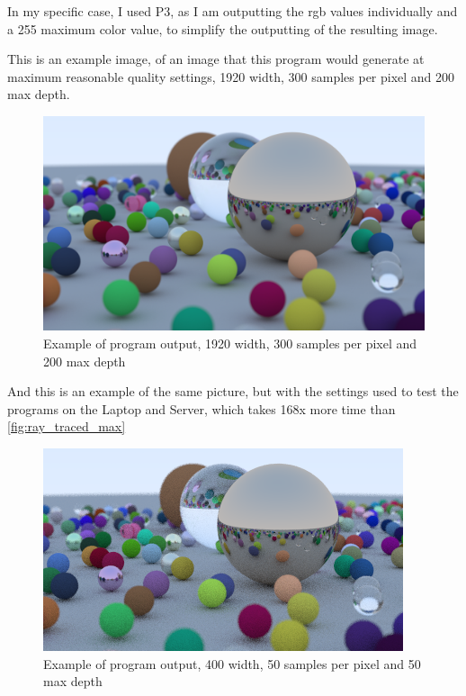 In my specific case, I used P3, as I am outputting the \gls{rgb} values individually and a 255 maximum color value, to simplify the outputting of the resulting image.

This is an example image, of an image that this program would generate at maximum reasonable quality settings, 1920 width, 300 samples per pixel and 200 max depth.

\begin{figure}[h]
    \centering
    \includegraphics[width=0.65\linewidth]{img/ray_traced_balls.png}
    \caption{Example of program output, 1920 width, 300 samples per pixel and 200 max depth}
    \label{fig:ray_traced_max}
\end{figure}

And this is an example of the same picture, but with the settings used to test the programs on the Laptop and Server, which takes 168x more time than \autoref{fig:ray_traced_max}

\begin{figure}[h]
    \centering
    \includegraphics[width=0.65\linewidth]{img/regular_spheres_output.png}
    \caption{Example of program output, 400 width, 50 samples per pixel and 50 max depth}
    \label{fig:ray_traced_average}
\end{figure}